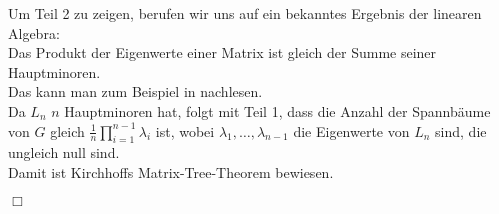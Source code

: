 Um Teil 2 zu zeigen, berufen wir uns auf ein bekanntes Ergebnis der linearen Algebra:\\
Das Produkt der Eigenwerte einer Matrix ist gleich der Summe seiner Hauptminoren.\\
Das kann man zum Beispiel in \cite{meyer_2005} nachlesen. \\
Da $L_n$ $n$ Hauptminoren hat, folgt mit Teil 1, dass die Anzahl der Spannbäume von $G$ gleich $\frac{1}{n}\prod_{i=1}^{n-1}\lambda_i$ ist, wobei $\lambda_1,\ldots,\lambda_{n-1}$ die Eigenwerte von $L_n$ sind, die ungleich null sind. \\
Damit ist Kirchhoffs Matrix-Tree-Theorem bewiesen.
\begin{flushright} $\Box$ \end{flushright} 
 
